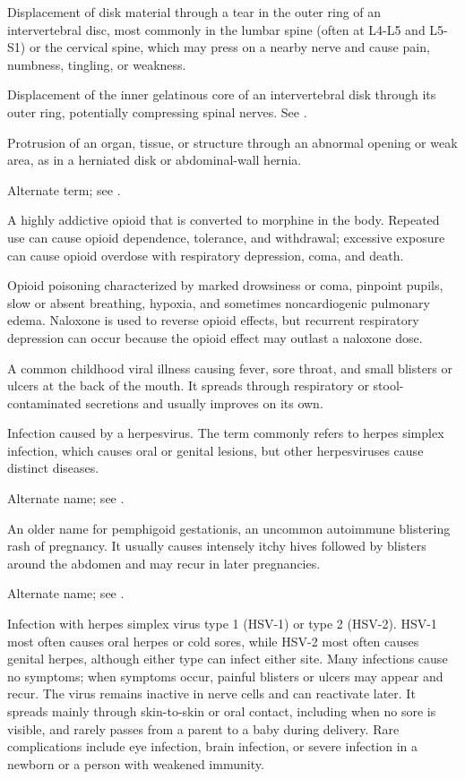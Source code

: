  Displacement of disk material through a tear in the outer ring of an intervertebral disc, most commonly in the lumbar spine (often at L4-L5 and L5-S1) or the cervical spine, which may press on a nearby nerve and cause pain, numbness, tingling, or weakness.

 Displacement of the inner gelatinous core of an intervertebral disk through its outer ring, potentially compressing spinal nerves. See .

 Protrusion of an organ, tissue, or structure through an abnormal opening or weak area, as in a herniated disk or abdominal-wall hernia.

 Alternate term; see .

 A highly addictive opioid that is converted to morphine in the body. Repeated use can cause opioid dependence, tolerance, and withdrawal; excessive exposure can cause opioid overdose with respiratory depression, coma, and death.

 Opioid poisoning characterized by marked drowsiness or coma, pinpoint pupils, slow or absent breathing, hypoxia, and sometimes noncardiogenic pulmonary edema. Naloxone is used to reverse opioid effects, but recurrent respiratory depression can occur because the opioid effect may outlast a naloxone dose.

 A common childhood viral illness causing fever, sore throat, and small blisters or ulcers at the back of the mouth. It spreads through respiratory or stool-contaminated secretions and usually improves on its own.

 Infection caused by a herpesvirus. The term commonly refers to herpes simplex infection, which causes oral or
genital lesions, but other herpesviruses cause distinct diseases.

 Alternate name; see .

 An older name for pemphigoid gestationis, an uncommon autoimmune blistering rash of pregnancy. It usually causes intensely itchy hives followed by blisters around the abdomen and may recur in later pregnancies.

 Alternate name; see .

 Infection with herpes simplex virus type 1 (HSV-1) or type 2 (HSV-2). HSV-1 most often causes oral herpes or cold sores, while HSV-2 most often causes genital herpes, although either type can infect either site. Many infections cause no symptoms; when symptoms occur, painful blisters or ulcers may appear and recur. The virus remains inactive in nerve cells and can reactivate later. It spreads mainly through skin-to-skin or oral contact, including when no sore is visible, and rarely passes from a parent to a baby during delivery. Rare complications include eye infection, brain infection, or severe infection in a newborn or a person with weakened immunity.

